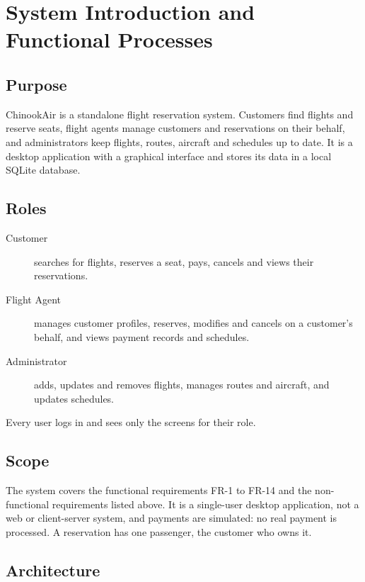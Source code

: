 \section{System Introduction and Functional Processes}

\subsection*{Purpose}

ChinookAir is a standalone flight reservation system. Customers find flights
and reserve seats, flight agents manage customers and reservations on their
behalf, and administrators keep flights, routes, aircraft and schedules up to
date. It is a desktop application with a graphical interface and stores its
data in a local SQLite database.

\subsection*{Roles}

\begin{description}
\item[Customer] searches for flights, reserves a seat, pays, cancels and views
  their reservations.
\item[Flight Agent] manages customer profiles, reserves, modifies and cancels
  on a customer's behalf, and views payment records and schedules.
\item[Administrator] adds, updates and removes flights, manages routes and
  aircraft, and updates schedules.
\end{description}

Every user logs in and sees only the screens for their role.

\subsection*{Scope}

The system covers the functional requirements FR-1 to FR-14 and the
non-functional requirements listed above. It is a single-user desktop
application, not a web or client-server system, and payments are simulated:
no real payment is processed. A reservation has one passenger, the customer
who owns it.

\subsection*{Architecture}

